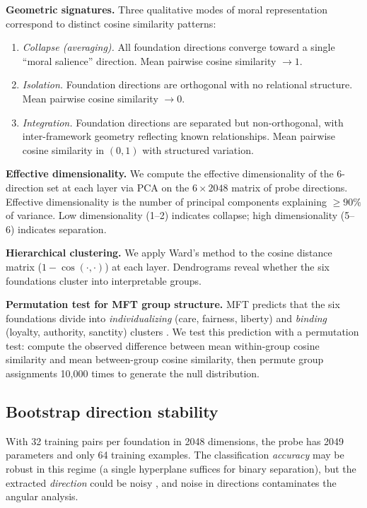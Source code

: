 \textbf{Geometric signatures.} Three qualitative modes of moral
representation correspond to distinct cosine similarity patterns:

\begin{enumerate}
\def\labelenumi{\arabic{enumi}.}
\item
  \emph{Collapse (averaging).} All foundation directions converge
  toward a single ``moral salience'' direction. Mean pairwise
  cosine similarity \(\to 1\).
\item
  \emph{Isolation.} Foundation directions are orthogonal with no
  relational structure. Mean pairwise cosine similarity \(\to 0\).
\item
  \emph{Integration.} Foundation directions are separated but
  non-orthogonal, with inter-framework geometry reflecting known
  relationships. Mean pairwise cosine similarity in \((0, 1)\) with
  structured variation.
\end{enumerate}

\textbf{Effective dimensionality.} We compute the effective
dimensionality of the 6-direction set at each layer via PCA on
the \(6 \times 2048\) matrix of probe directions. Effective
dimensionality is the number of principal components explaining
\(\geq 90\%\) of variance. Low dimensionality (1--2) indicates
collapse; high dimensionality (5--6) indicates separation.

\textbf{Hierarchical clustering.} We apply Ward's method to the cosine
distance matrix (\(1 - \cos(\cdot, \cdot)\)) at each layer.
Dendrograms reveal whether the six foundations cluster into
interpretable groups.

\textbf{Permutation test for MFT group structure.} MFT predicts that
the six foundations divide into \emph{individualizing} (care, fairness,
liberty) and \emph{binding} (loyalty, authority, sanctity) clusters
\citep{graham2013mft}. We test this prediction with a permutation
test: compute the observed difference between mean within-group
cosine similarity and mean between-group cosine similarity, then
permute group assignments 10,000 times to generate the null
distribution.

\subsection{Bootstrap direction stability}\label{bootstrap-direction-stability}

With 32 training pairs per foundation in 2048 dimensions, the probe
has 2049 parameters and only 64 training examples. The classification
\emph{accuracy} may be robust in this regime (a single hyperplane suffices
for binary separation), but the extracted \emph{direction} could be noisy
, and noise in directions contaminates the angular analysis.

